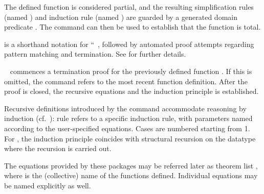 \begin{isabellebody}
\begin{isamarkuptext}
\begin{description}
  The defined function is considered partial, and the resulting
  simplification rules (named ) and induction rule
  (named ) are guarded by a generated domain
  predicate . The \hyperlink{command.HOL.termination}{\mbox{}}
  command can then be used to establish that the function is total.

  \item \hyperlink{command.HOL.fun}{\mbox{}} is a shorthand notation for ``\hyperlink{command.HOL.function}{\mbox{}}~, followed by automated
  proof attempts regarding pattern matching and termination.  See
  \cite{isabelle-function} for further details.

  \item \hyperlink{command.HOL.termination}{\mbox{}}~ commences a
  termination proof for the previously defined function .  If
  this is omitted, the command refers to the most recent function
  definition.  After the proof is closed, the recursive equations and
  the induction principle is established.

  \end{description}

  Recursive definitions introduced by the \hyperlink{command.HOL.function}{\mbox{}}
  command accommodate reasoning by induction (cf.\ \hyperlink{method.induct}{\mbox{}}):
  rule  refers to a specific induction rule, with
  parameters named according to the user-specified equations. Cases
  are numbered starting from 1.  For \hyperlink{command.HOL.primrec}{\mbox{}}, the
  induction principle coincides with structural recursion on the
  datatype where the recursion is carried out.

  The equations provided by these packages may be referred later as
  theorem list , where  is the (collective)
  name of the functions defined.  Individual equations may be named
  explicitly as well.


\end{isamarkuptext}
\end{isabellebody}
